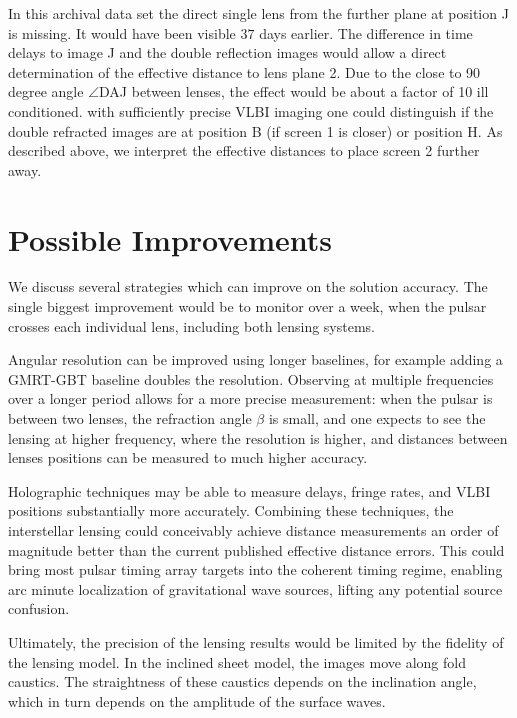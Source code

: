 \documentclass[useAMS,usenatbib]{mn2e}
\begin{document}
In this archival data set the direct single lens from the further
plane at position J is missing.  It would have been visible $37$ days
earlier. The difference in time delays to image J and the double
reflection images would allow a direct determination of the effective
distance to lens plane 2.  Due to the close to 90 degree angle $\angle$DAJ
between lenses, the effect would be about a factor of 10 ill
conditioned.  with sufficiently precise VLBI imaging one could
distinguish if the double refracted images are at position B (if
screen 1 is closer) or position H.  As described above, we interpret
the effective distances to place screen 2 further away.

\section{Possible Improvements}

We discuss several strategies which can improve on the solution
accuracy.  The single biggest improvement would be to monitor over a
week, when the pulsar crosses each individual lens, including both
lensing systems.

Angular resolution can be improved using longer baselines, for example
adding a GMRT-GBT baseline doubles the resolution.  Observing at
multiple frequencies over a longer period allows for a more precise
measurement: when the pulsar is between two lenses, the refraction
angle $\beta$ is small, and one expects to see the lensing at higher
frequency, where the resolution is higher, and distances between
lenses positions can be measured to much higher accuracy.

Holographic techniques \citep{2008MNRAS.388.1214W,2014MNRAS.440L..36P}
may be able to measure delays, fringe rates, and VLBI positions
substantially more accurately.  Combining these techniques, the
interstellar lensing could conceivably achieve distance measurements
an order of magnitude better than the current published effective
distance errors.  This could bring most pulsar timing array targets
into the coherent timing regime, enabling arc minute localization of
gravitational wave sources, lifting any potential source confusion.

Ultimately, the precision of the lensing results would be limited by
the fidelity of the lensing model.  In the inclined sheet model, the
images move along fold caustics.  The straightness of these caustics
depends on the inclination angle, which in turn depends on the
amplitude of the surface waves.  
\end{document}
